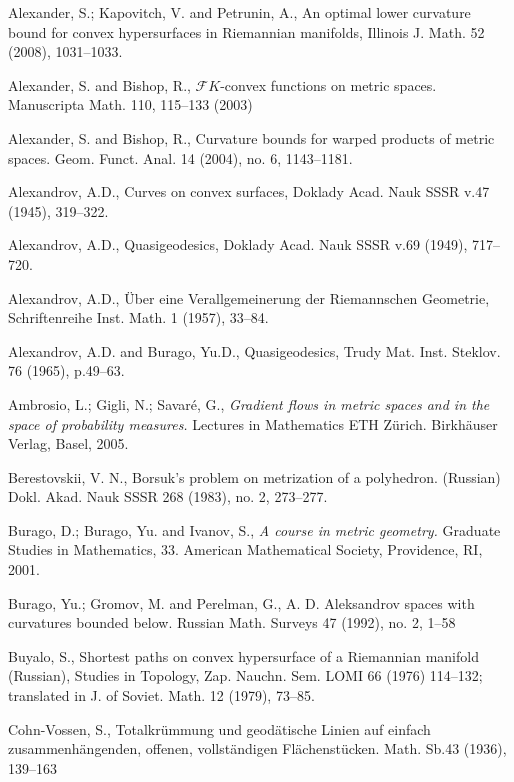 \documentclass{article}
\begin{document}
\begin{thebibliography}{Bibliography} 


Alexander, S.;  
Kapovitch, V. 
and 
Petrunin, A., 
An optimal lower curvature bound for convex hypersurfaces in Riemannian manifolds, Illinois J. Math. 52 (2008), 1031--1033. 

 Alexander, S. and
Bishop, R., $\mathcal F
K$-convex functions on metric spaces. Manuscripta Math. 110, 115--133 (2003)

 Alexander, S. and  Bishop, R., 
Curvature bounds for warped products of metric spaces.  Geom. Funct. Anal.  14  (2004),  no. 6, 1143--1181.


 Alexandrov, A.D.,
Curves on convex surfaces, Doklady
Acad. Nauk SSSR
v.47 (1945), 319--322.

 Alexandrov, A.D., Quasigeodesics, Doklady Acad. Nauk SSSR v.69 (1949),
717--720.

 Alexandrov, A.D., \"Uber eine Verallgemeinerung der Riemannschen Geometrie,
Schriftenreihe Inst. Math. 1 (1957), 33--84.

  Alexandrov, A.D. and  Burago, Yu.D., Quasigeodesics, Trudy Mat. Inst. Steklov.
76 (1965), p.49--63.

 Ambrosio, L.; Gigli, N.; Savar\'e, G.,
\textit{Gradient flows in metric spaces and in the space of probability measures.} Lectures in Mathematics ETH Zürich. Birkhäuser Verlag, Basel, 2005. 

Berestovskii, V. N.,
Borsuk's problem on metrization of a polyhedron. (Russian)
Dokl. Akad. Nauk SSSR 268 (1983), no. 2, 273--277.

Burago, D.; Burago, Yu. and Ivanov, S., 
\textit{A course in metric geometry.} Graduate Studies in Mathematics, 33. American Mathematical Society, Providence, RI, 2001.


Burago, Yu.; 
Gromov, M. and Perelman, G., 
A. D. Aleksandrov spaces
with curvatures bounded below.  Russian Math. Surveys  47  (1992),  no. 2,
1--58

Buyalo, S., 
Shortest paths on convex
hypersurface of a Riemannian manifold (Russian), Studies in Topology, Zap. Nauchn. Sem.
LOMI 66 (1976) 114--132; translated in J. of Soviet. Math. 12 (1979), 73--85.

Cohn-Vossen, S., 
Totalkr\"ummung und geod\"atische Linien auf einfach zusammenh\"angenden, offenen, vollst\"andigen Fl\"achenst\"ucken. Math. Sb.43 (1936), 139--163


\end{thebibliography}
\end{document}
